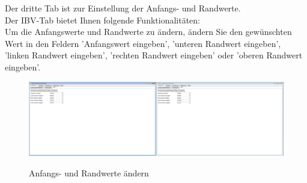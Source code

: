 \noindent
Der dritte Tab ist zur Einstellung der Anfangs- und Randwerte.\\
Der IBV-Tab bietet Ihnen folgende Funktionalitäten:\\
Um die Anfangswerte und Randwerte zu ändern, ändern Sie den gewünschten Wert in den Feldern 'Anfangswert eingeben', 'unteren Randwert eingeben', 'linken Randwert eingeben', 'rechten Randwert eingeben' oder 'oberen Randwert eingeben'.
\begin{figure}[H]
\centering
\includegraphics[scale=.25]{Benutzerdokumentation/IBVWerteAendern.png}\\
\caption{Anfangs- und Randwerte ändern}
\label{IBVWerteAendern}
\end{figure}

